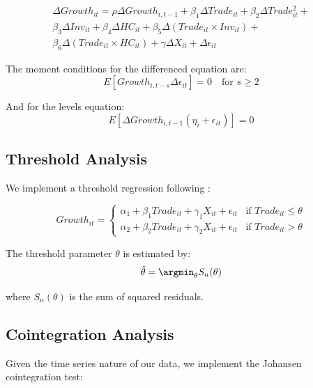 \documentclass[12pt,a4paper]{article}
\theoremstyle{definition}
\begin{document}
\begin{equation}
\begin{split}
\Delta Growth_{it} = \rho \Delta Growth_{i,t-1} + \beta_1 \Delta Trade_{it} + \beta_2 \Delta Trade_{it}^2 + \\
\beta_3 \Delta Inv_{it} + \beta_4 \Delta HC_{it} + \beta_5 \Delta(Trade_{it} \times Inv_{it}) + \\
\beta_6 \Delta(Trade_{it} \times HC_{it}) + \gamma \Delta X_{it} + \Delta \epsilon_{it}
\end{split}
\end{equation}

The moment conditions for the differenced equation are:
\begin{equation}
E[Growth_{i,t-s} \Delta \epsilon_{it}] = 0 \quad \text{for } s \geq 2
\end{equation}

And for the levels equation:
\begin{equation}
E[\Delta Growth_{i,t-1}(\eta_i + \epsilon_{it})] = 0
\end{equation}

\subsection{Threshold Analysis}
We implement a threshold regression following \cite{hansen2000sample}:

\begin{equation}
Growth_{it} = \begin{cases}
\alpha_1 + \beta_1 Trade_{it} + \gamma_1 X_{it} + \epsilon_{it} & \text{if } Trade_{it} \leq \theta \\
\alpha_2 + \beta_2 Trade_{it} + \gamma_2 X_{it} + \epsilon_{it} & \text{if } Trade_{it} > \theta
\end{cases}
\end{equation}

The threshold parameter $\theta$ is estimated by:
\begin{equation}
\hat{\theta} = \argmin_{\theta} S_n(\theta)
\end{equation}

where $S_n(\theta)$ is the sum of squared residuals.

\subsection{Cointegration Analysis}
Given the time series nature of our data, we implement the Johansen cointegration test:
\end{document}
